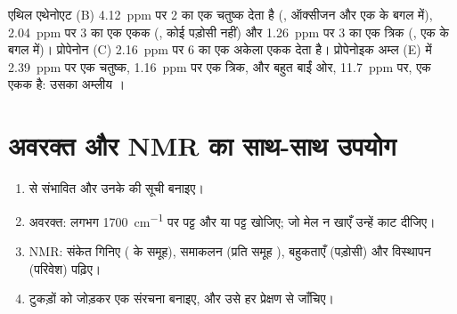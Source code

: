 \begin{example}[स्पेक्ट्रम पढ़ना]\label{ex:g12:proton-nmr:reading}
एथिल एथेनोएट (B) \qty{4.12}{ppm} पर 2  का एक चतुष्क देता है
(, ऑक्सीजन और एक  के बगल में), \qty{2.04}{ppm} पर 3  का
एक एकक (, कोई पड़ोसी  नहीं) और \qty{1.26}{ppm} पर 3
 का एक त्रिक (, एक  के बगल में)। प्रोपेनोन (C)
\qty{2.16}{ppm} पर 6  का एक अकेला एकक देता है। प्रोपेनोइक अम्ल (E)
में \qty{2.39}{ppm} पर एक चतुष्क, \qty{1.16}{ppm} पर एक त्रिक, और
बहुत बाईं ओर, \qty{11.7}{ppm} पर, एक एकक है: उसका अम्लीय ।
\end{example}

\section{अवरक्त और NMR का साथ-साथ उपयोग}


\begin{method}\label{met:g12:proton-nmr:identify}
\begin{enumerate}
  \item {} से संभावित  और उनके
         की सूची बनाइए।
  \item अवरक्त: लगभग \qty{1700}{cm^{-1}} पर  पट्ट और
         या  पट्ट खोजिए; जो  मेल न खाएँ
        उन्हें काट दीजिए।
  \item NMR: संकेत गिनिए ( के समूह), समाकलन
        (प्रति समूह ), बहुकताएँ (पड़ोसी)
        और विस्थापन (परिवेश) पढ़िए।
  \item टुकड़ों को जोड़कर एक संरचना बनाइए, और उसे हर
        प्रेक्षण से जाँचिए।
\end{enumerate}
\end{method}

